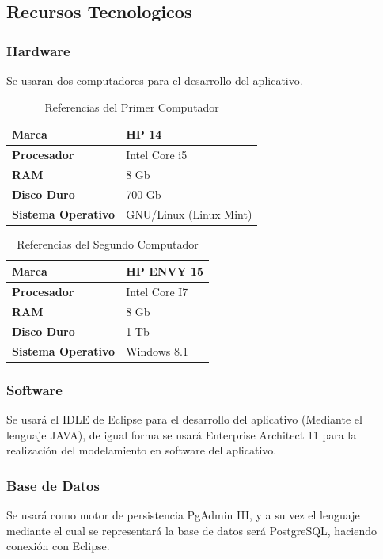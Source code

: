 \subsection{Recursos Tecnologicos}
\subsubsection*{Hardware}
Se usaran dos computadores para el desarrollo del aplicativo.
\begin{table}[h!]
	\begin{center}
		\begin{tabular}{|p{7cm} |p{7cm}|} 
			\hline \textbf{Marca} &  HP 14\\
			\hline \textbf{Procesador} &  Intel Core i5\\
			\hline \textbf{RAM} &  8 Gb\\
			\hline \textbf{Disco Duro} &  700 Gb\\
			\hline \textbf{Sistema Operativo} &  GNU/Linux (Linux Mint)\\
			\hline
		\end{tabular}
		\caption{Referencias del Primer Computador}
		\label{equipoU}
	\end{center}
\end{table}
\newpage

\begin{table}[h!]
	\begin{center}
		\begin{tabular}{|p{7cm} |p{7cm}|} 
			\hline \textbf{Marca} &  HP ENVY 15 \\
			\hline \textbf{Procesador} &  Intel Core I7\\
			\hline \textbf{RAM} &  8 Gb\\
			\hline \textbf{Disco Duro} &  1 Tb\\
			\hline \textbf{Sistema Operativo} &  Windows 8.1\\
			\hline
		\end{tabular}
		\caption{Referencias del Segundo Computador}
		\label{equipoD}
	\end{center}
\end{table}
\subsubsection*{Software}
Se usar\'a el IDLE de Eclipse para el desarrollo del aplicativo (Mediante el lenguaje JAVA), de igual forma se usará Enterprise Architect 11 para la realizaci\'on del modelamiento en software del aplicativo.
\subsubsection*{Base de Datos}
Se usar\'a como motor de persistencia PgAdmin III, y a su vez el lenguaje mediante el cual se representar\'a la base de datos ser\'a PostgreSQL, haciendo conexi\'on con Eclipse.
